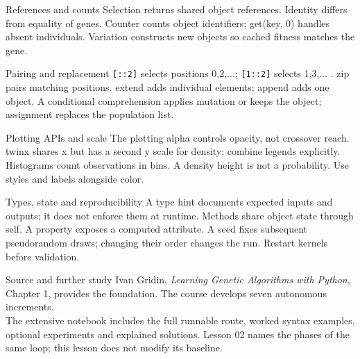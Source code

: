 \begin{frame}[fragile]{References and counts}
Selection returns shared object references. Identity differs from equality of genes. Counter counts object identifiers; get(key, 0) handles absent individuals. Variation constructs new objects so cached fitness matches the gene.
\end{frame}

\begin{frame}[fragile]{Pairing and replacement}
\texttt{[::2]} selects positions 0,2,...; \texttt{[1::2]} selects 1,3,... . zip pairs matching positions. extend adds individual elements; append adds one object. A conditional comprehension applies mutation or keeps the object; assignment replaces the population list.
\end{frame}

\begin{frame}[fragile]{Plotting APIs and scale}
The plotting alpha controls opacity, not crossover reach. twinx shares x but has a second y scale for density; combine legends explicitly. Histograms count observations in bins. A density height is not a probability. Use styles and labels alongside color.
\end{frame}

\begin{frame}[fragile]{Types, state and reproducibility}
A type hint documents expected inputs and outputs; it does not enforce them at runtime. Methods share object state through self. A property exposes a computed attribute. A seed fixes subsequent pseudorandom draws; changing their order changes the run. Restart kernels before validation.
\end{frame}

\begin{frame}[fragile]{Source and further study}
Ivan Gridin, \emph{Learning Genetic Algorithms with Python}, Chapter 1, provides the foundation. The course develops seven autonomous increments.\\[0.7em]
The extensive notebook includes the full runnable route, worked syntax examples, optional experiments and explained solutions. Lesson 02 names the phases of the same loop; this lesson does not modify its baseline.
\end{frame}

